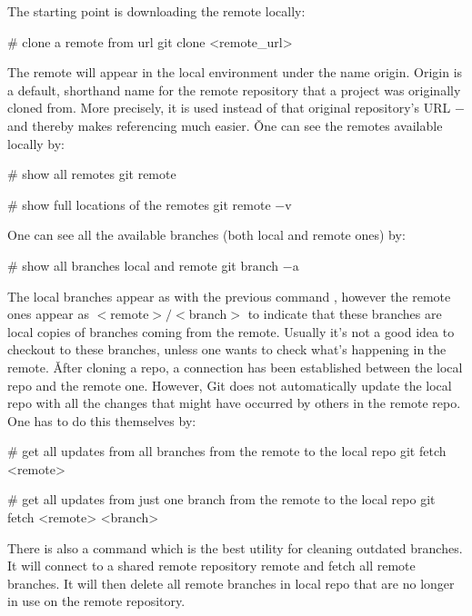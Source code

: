 The starting point is downloading the remote locally:

\begin{bash}
# clone a remote from url
git clone <remote_url>
\end{bash}

The remote will appear in the local environment under the name origin. Origin is a default, shorthand name for the
remote repository that a project was originally cloned from. More precisely, it is used instead of that original
repository's URL $-$ and thereby makes referencing much easier. \v

One can see the remotes available locally by:

\begin{bash}
# show all remotes
git remote
\end{bash}

\begin{bash}
# show full locations of the remotes
git remote $-$v
\end{bash}

One can see all the available branches (both local and remote ones) by:

\begin{bash}
# show all branches local and remote
git branch $-$a
\end{bash}

The local branches appear as with the previous command , however the remote ones appear as
$<$remote$>/<$branch$>$ to indicate that these branches are local copies of branches coming from the remote. Usually
it’s not a good idea to checkout to these branches, unless one wants to check what’s happening in the remote. \v

After cloning a repo, a connection has been established between the local repo and the remote one. However, Git does
not automatically update the local repo with all the changes that might have occurred by others in the remote repo.
One has to do this themselves by:

\begin{bash}
# get all updates from all branches from the remote to the local repo
git fetch <remote>
\end{bash}

\begin{bash}
# get all updates from just one branch from the remote to the local repo
git fetch <remote> <branch>
\end{bash}

There is also a command which is the best utility for cleaning outdated branches. It will connect to a shared remote
repository remote and fetch all remote branches. It will then delete all remote branches in local repo that are no
longer in use on the remote repository.


